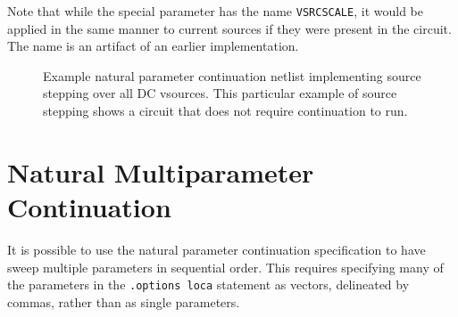 Note that while the special parameter has the name \texttt{VSRCSCALE}, 
it would be applied in the same manner to current sources if they were
present in the circuit.  The name is an artifact of an earlier 
implementation.

\begin{figure}[htbp]
\begin{centering}
\caption[Example natural parameter continuation netlist]{Example natural parameter continuation netlist implementing source stepping over all DC vsources. This particular example of source stepping shows a circuit that does not require continuation to run.\label{Continuation_Netlist_sourceStepping2}}
\end{centering}
\end{figure}

\newpage 
\section{Natural Multiparameter Continuation} 
\label{continuation_natural_multiparam}

It is possible to use the natural parameter continuation specification to  
have \Xyce{} sweep multiple parameters in sequential order.  This 
requires specifying many of the parameters in the \texttt{.options loca} statement as vectors, delineated by commas, rather than as single parameters.  

